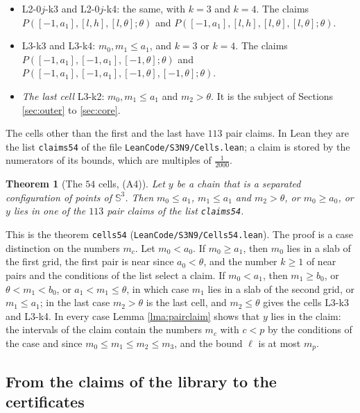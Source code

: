 \documentclass[reqno,a4paper,11pt]{amsart}
\numberwithin{equation}{section}
\newtheorem{theorem}{Theorem}[section]
\newcommand{\Sph}{\mathbb{S}}
\newcommand{\lean}[1]{\texttt{#1}}
\newcommand{\file}[1]{\nolinkurl{#1}}
\begin{document}
\begin{itemize}
    \item \textup{L2-0$j$-k3} and \textup{L2-0$j$-k4}: the same, with $k = 3$ and $k = 4$. The claims $P([-1,a_1],\allowbreak[l,h],\allowbreak[l,\theta]; \theta)$ and $P([-1,a_1],\allowbreak[l,h],\allowbreak[l,\theta],\allowbreak[l,\theta]; \theta)$.
    \item \textup{L3-k3} and \textup{L3-k4}: $m_0, m_1 \leq a_1$, and $k = 3$ or $k = 4$. The claims $P([-1,a_1],\allowbreak[-1,a_1],\allowbreak[-1,\theta]; \theta)$ and $P([-1,a_1],\allowbreak[-1,a_1],\allowbreak[-1,\theta],\allowbreak[-1,\theta]; \theta)$.
    \item \emph{The last cell} \textup{L3-k2}: $m_0, m_1 \leq a_1$ and $m_2 > \theta$. It is the subject of Sections \ref{sec:outer} to \ref{sec:core}.
\end{itemize}
The cells other than the first and the last have $113$ pair claims. In Lean they are the list \lean{claims54} of the file \file{LeanCode/S3N9/Cells.lean}; a claim is stored by the numerators of its bounds, which are multiples of $\tfrac{1}{2000}$.

\begin{theorem}[The $54$ cells, (A4)]\label{thm:cells54}
Let $y$ be a chain that is a separated configuration of points of $\Sph^3$. Then $m_0 \leq a_1$, $m_1 \leq a_1$ and $m_2 > \theta$, or $m_0 \geq a_0$, or $y$ lies in one of the $113$ pair claims of the list \lean{claims54}.
\end{theorem}

This is the theorem \lean{cells54} (\file{LeanCode/S3N9/Cells54.lean}). The proof is a case distinction on the numbers $m_c$. Let $m_0 < a_0$. If $m_0 \geq a_1$, then $m_0$ lies in a slab of the first grid, the first pair is near since $a_0 < \theta$, and the number $k \geq 1$ of near pairs and the conditions of the list select a claim. If $m_0 < a_1$, then $m_1 \geq b_0$, or $\theta < m_1 < b_0$, or $a_1 < m_1 \leq \theta$, in which case $m_1$ lies in a slab of the second grid, or $m_1 \leq a_1$; in the last case $m_2 > \theta$ is the last cell, and $m_2 \leq \theta$ gives the cells \textup{L3-k3} and \textup{L3-k4}. In every case Lemma \ref{lma:pairclaim} shows that $y$ lies in the claim: the intervals of the claim contain the numbers $m_c$ with $c < p$ by the conditions of the case and since $m_0 \leq m_1 \leq m_2 \leq m_3$, and the bound $\ell$ is at most $m_p$.

\subsection{From the claims of the library to the certificates}\label{sec:fit}
\end{document}
